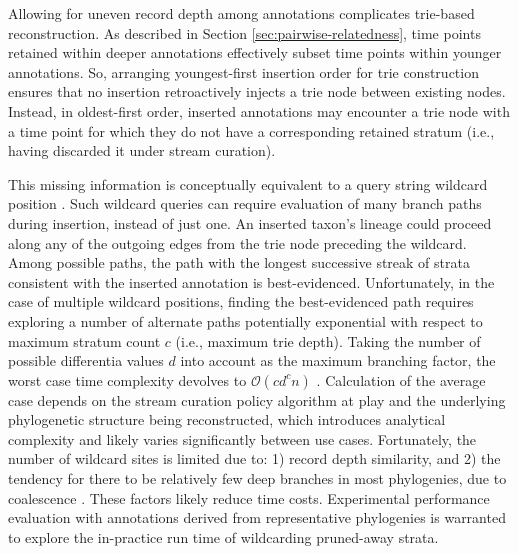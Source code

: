 Allowing for uneven record depth among annotations complicates trie-based reconstruction.
As described in Section \ref{sec:pairwise-relatedness}, time points retained within deeper annotations effectively subset time points within younger annotations.
So, arranging youngest-first insertion order for trie construction ensures that no insertion retroactively injects a trie node between existing nodes.
Instead, in oldest-first order, inserted annotations may encounter a trie node with a time point for which they do not have a corresponding retained stratum (i.e., having discarded it under stream curation).

This missing information is conceptually equivalent to a query string wildcard position \citep{fukuyama2016partial}.
Such wildcard queries can require evaluation of many branch paths during insertion, instead of just one.
An inserted taxon's lineage could proceed along any of the outgoing edges from the trie node preceding the wildcard.
Among possible paths, the path with the longest successive streak of strata consistent with the inserted annotation is best-evidenced.
Unfortunately, in the case of multiple wildcard positions, finding the best-evidenced path requires exploring a number of alternate paths potentially exponential with respect to maximum stratum count $c$ (i.e., maximum trie depth).
Taking the number of possible differentia values $d$ into account as the maximum branching factor, the worst case time complexity devolves to $\mathcal{O}(c d^c n)$ \citep{fukuyama2016partial}.
Calculation of the average case depends on the stream curation policy algorithm at play and the underlying phylogenetic structure being reconstructed, which introduces analytical complexity and likely varies significantly between use cases.
Fortunately, the number of wildcard sites is limited due to: 1) record depth similarity, and 2) the tendency for there to be relatively few deep branches in most phylogenies, due to coalescence \citep{nordborgCoalescentTheory2019, berestyckiRecentProgressCoalescent2009}.
These factors likely reduce time costs.
Experimental performance evaluation with annotations derived from representative phylogenies is warranted to explore the in-practice run time of wildcarding pruned-away strata.



